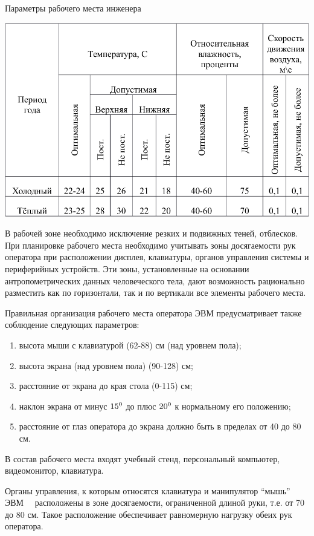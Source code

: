\begin{table}[!ht]
\caption{Параметры рабочего места инженера}
\centering
\includegraphics[page=5, width=1\linewidth]{secure_table.pdf}
\label{tab:arm_ing_locate}
\end{table}

В рабочей зоне необходимо исключение резких и подвижных теней, отблесков. При планировке рабочего места необходимо учитывать зоны досягаемости рук оператора при расположении дисплея, клавиатуры, органов управления системы и периферийных устройств. Эти зоны, установленные на основании антропометрических данных человеческого тела, дают возможность рационально разместить как по горизонтали, так и по вертикали все элементы рабочего места.

Правильная организация рабочего места оператора ЭВМ предусматривает также соблюдение следующих параметров:

\begin{enumerate}
\item высота мыши с клавиатурой (62-88) см (над уровнем пола);
\item высота экрана (над уровнем пола) (90-128) см;
\item расстояние от экрана до края стола (0-115) см;
\item наклон экрана от минус $15\textsuperscript{0}$ до плюс $20\textsuperscript{0}$ к нормальному его положению;
\item расстояние от глаз оператора до экрана должно быть в пределах от 40 до 80 см.
\end{enumerate}
В состав рабочего места входят учебный стенд, персональный компьютер, видеомонитор, клавиатура.

Органы управления, к которым относятся клавиатура и манипулятор ``мышь'' ЭВМ \ \ расположены в зоне досягаемости, ограниченной длиной руки, т.е. от 70 до 80 см. Такое расположение обеспечивает равномерную нагрузку обеих рук оператора.


